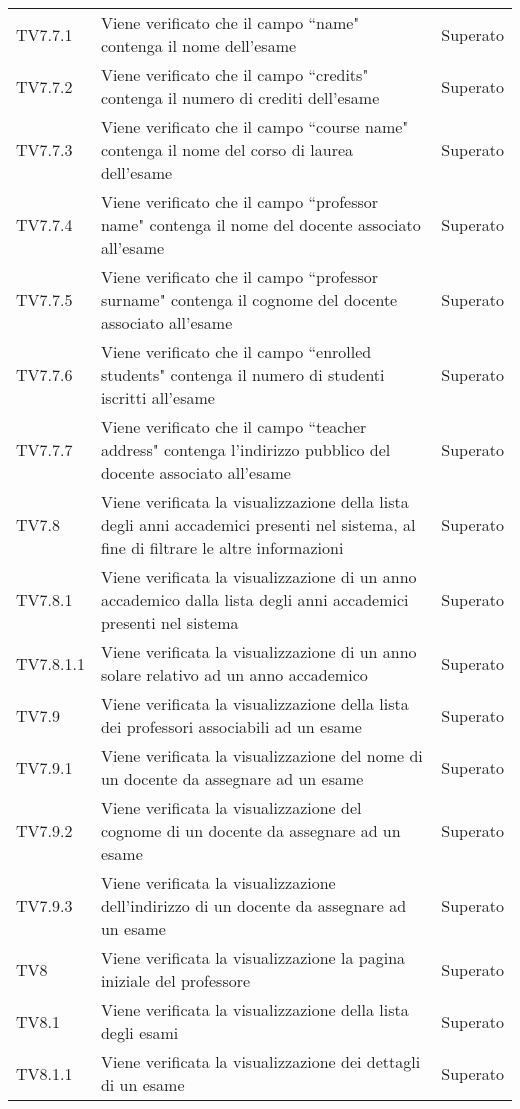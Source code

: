 \documentclass[PianoDiQualifica.tex]{subfiles}
\begin{document}
\begin{longtable}[H]{P{2cm}P{8.5cm}P{3cm}}
	TV7.7.1 & Viene verificato che il campo ``name" contenga il nome dell'esame & Superato \\ 
	TV7.7.2 & Viene verificato che il campo ``credits" contenga il numero di crediti dell'esame & Superato \\ 
	TV7.7.3 & Viene verificato che il campo ``course name" contenga il nome del corso di laurea dell'esame & Superato \\ 
	TV7.7.4 & Viene verificato che il campo ``professor name" contenga il nome del docente associato all'esame & Superato \\ 
	TV7.7.5 & Viene verificato che il campo ``professor surname" contenga il cognome del docente associato all'esame & Superato \\ 
	TV7.7.6 & Viene verificato che il campo ``enrolled students" contenga il numero di studenti iscritti all'esame & Superato \\ 
	TV7.7.7 & Viene verificato che il campo ``teacher address" contenga l'indirizzo pubblico del docente associato all'esame & Superato \\ 
	TV7.8 & Viene verificata la visualizzazione della lista degli anni accademici presenti nel sistema, al fine di filtrare le altre informazioni & Superato \\ 
	TV7.8.1 & Viene verificata la visualizzazione di un anno accademico dalla lista degli anni accademici presenti nel sistema & Superato \\ 
	TV7.8.1.1 & Viene verificata la visualizzazione di un anno solare relativo ad un anno accademico & Superato \\ 
	TV7.9 & Viene verificata la visualizzazione della lista dei professori associabili ad un esame & Superato \\
	TV7.9.1 & Viene verificata la visualizzazione del nome di un docente da assegnare ad un esame  & Superato \\
	TV7.9.2 & Viene verificata la visualizzazione del cognome di un docente da assegnare ad un esame  
	 & Superato \\
	TV7.9.3 & Viene verificata la visualizzazione dell'indirizzo di un docente da assegnare ad un esame & Superato \\
	TV8 & Viene verificata la visualizzazione la pagina iniziale del professore & Superato \\
	TV8.1 & Viene verificata la visualizzazione della lista degli esami
	 & Superato \\
	TV8.1.1 & Viene verificata la visualizzazione dei dettagli di un esame & Superato \\

\end{longtable}
\end{document}
